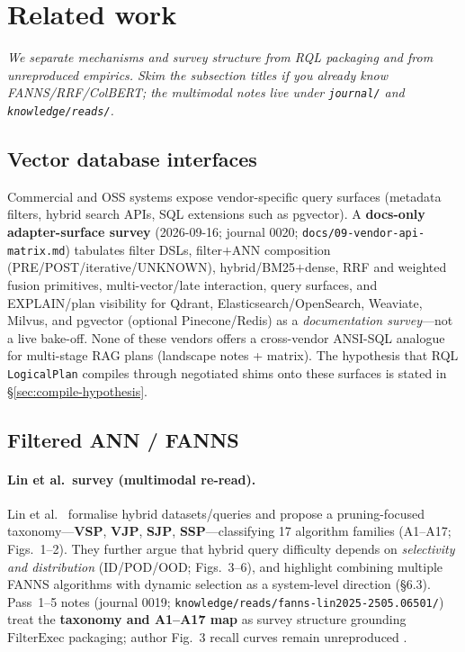 \section{Related work}
\label{sec:related}

\noindent\textit{We separate \established{} mechanisms and survey structure from \hypothesis{} RQL packaging and from \authoronly{} unreproduced empirics.
Skim the subsection titles if you already know FANNS/RRF/ColBERT; the multimodal notes live under \texttt{journal/} and \texttt{knowledge/reads/}.}

\subsection{Vector database interfaces}
Commercial and OSS systems expose vendor-specific query surfaces (metadata filters, hybrid search APIs, SQL extensions such as pgvector).
A \textbf{docs-only adapter-surface survey} (2026-09-16; journal 0020; \texttt{docs/09-vendor-api-matrix.md}) tabulates filter DSLs, filter$+$ANN composition (PRE/POST/iterative/UNKNOWN), hybrid/BM25$+$dense, RRF and weighted fusion primitives, multi-vector/late interaction, query surfaces, and EXPLAIN/plan visibility for Qdrant, Elasticsearch/OpenSearch, Weaviate, Milvus, and pgvector (optional Pinecone/Redis) \established{} as a \emph{documentation survey}---not a live bake-off.
None of these vendors offers a cross-vendor ANSI-SQL analogue for multi-stage RAG plans \established{} (landscape notes + matrix).
The hypothesis that RQL \texttt{LogicalPlan} compiles through negotiated shims onto these surfaces is stated in \S\ref{sec:compile-hypothesis}.

\subsection{Filtered ANN / FANNS}
\paragraph{Lin et al.\ survey (multimodal re-read).}
Lin et al.~\citep{lin2025fanns} formalise hybrid datasets/queries and propose a pruning-focused taxonomy---\textbf{VSP}, \textbf{VJP}, \textbf{SJP}, \textbf{SSP}---classifying 17 algorithm families (A1--A17; Figs.~1--2).
They further argue that hybrid query difficulty depends on \emph{selectivity and distribution} (ID/POD/OOD; Figs.~3--6), and highlight combining multiple FANNS algorithms with dynamic selection as a system-level direction (\S6.3).
Pass~1--5 notes (journal 0019; \texttt{knowledge/reads/fanns-lin2025-2505.06501/}) treat the \textbf{taxonomy and A1--A17 map} as \established{} survey structure grounding $\mathrm{FilterExec}$ packaging; author Fig.~3 recall curves remain unreproduced \provisional{}.

